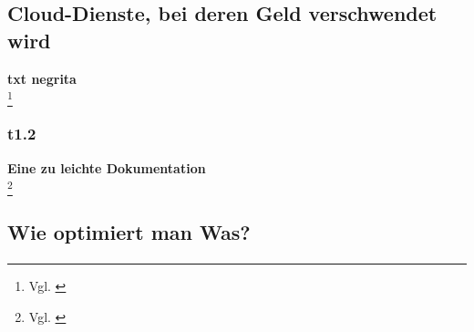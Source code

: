\paragraph{}

\subsection{Cloud-Dienste, bei deren Geld verschwendet wird}


\textbf{txt negrita}\\
\footnote{ Vgl. \cite{SO01}}
\newpage

\subsubsection{t1.2}

\textbf{Eine zu leichte Dokumentation}\\

\footnote{ Vgl. \cite{R01}}

\subsection{Wie optimiert man Was?}
\paragraph{}


